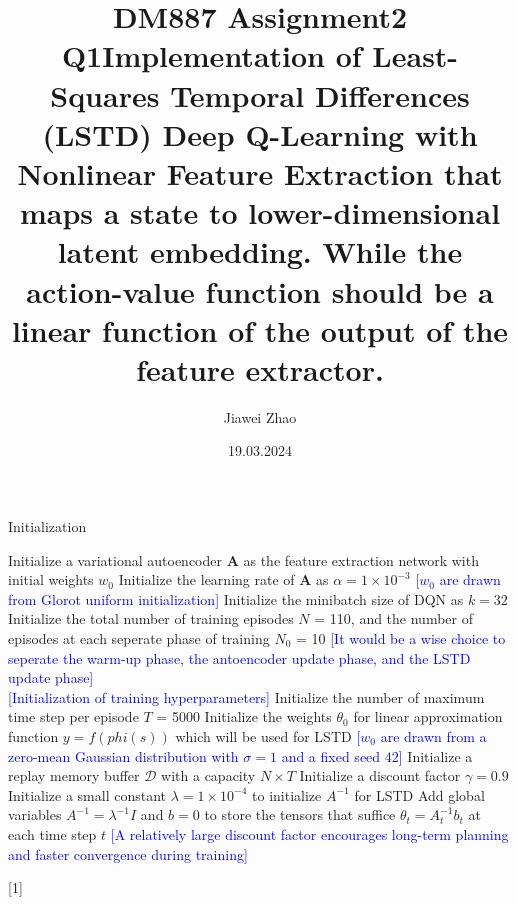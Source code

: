\documentclass[a4paper,12pt,oneside]{article}
\numberwithin{equation}{section}
\begin{document}
\title{DM887 Assignment2 Q1}
\author{Jiawei Zhao}
\date{19.03.2024}
\maketitle
\title {Implementation of Least-Squares Temporal Differences (LSTD) Deep Q-Learning with Nonlinear Feature Extraction that maps a state to lower-dimensional latent embedding. While the action-value function should be a linear function of the output of the feature extractor.}

\newcommand{\mycomment}[1]{{\fontfamily{lmss}\selectfont\textcolor{blue}{[#1]}}} %
    \begin{algorithm}
        \begin{algorithmic}[1]
        \caption{Initialization}
        \State Initialize a variational autoencoder $\mathbf{A}$ as the feature extraction network with initial weights \(w_0\)
        \State Initialize the learning rate of $\mathbf{A}$ as $\alpha=1 \times 10^{-3}$ 
        \mycomment {\(w_0\) are drawn from Glorot uniform initialization}
        \State Initialize the minibatch size of DQN as \(k=32\) 
        \State Initialize the total number of training episodes \(N\) = 110, and the number of episodes at each seperate phase of training \(N_0\) = 10
        \mycomment {It would be a wise choice to seperate the warm-up phase, the antoencoder update phase, and the LSTD update phase}
        \\
        \mycomment {Initialization of training hyperparameters}
        \State Initialize the number of maximum time step per episode \(T\) = 5000
        \State Initialize the weights $\theta_0$ for linear approximation function $y = f(phi(s))$ which will be used for LSTD
        \mycomment {\(w_0\) are drawn from a zero-mean Gaussian distribution with $\sigma=1$ and a fixed seed $42$}
        \State Initialize a replay memory buffer $\mathcal{D}$ with a capacity \(N \times T\)
        \State Initialize a discount factor $\gamma=0.9$ 
        \State Initialize a small constant $\lambda=1 \times 10^{-4}$ to initialize $A^{-1}$ for LSTD  
        \State Add global variables $A^{-1} = \lambda^{-1}I$ and $b=0$ to store the tensors that suffice $\theta_t = A_t^{-1} b_t$ at each time step \(t\)
        \mycomment{A relatively large discount factor encourages long-term planning and faster convergence during training}
        \end{algorithmic}[1]
    \end{algorithm}
        
\end{document}
